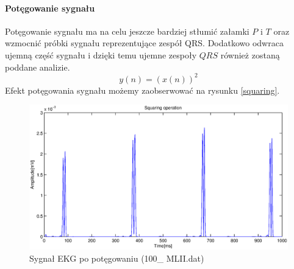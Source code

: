 \documentclass[a4paper, 11pt]{article}
\begin{document}
\paragraph{Potęgowanie sygnału}
Potęgowanie sygnału ma na celu jeszcze bardziej stłumić załamki $P$ i $T$ oraz wzmocnić próbki
sygnału reprezentujące zespół QRS. Dodatkowo odwraca ujemną część sygnału i dzięki temu ujemne zespoły $QRS$ również zostaną poddane analizie.
\begin{equation}
y(n) = (x(n))^2\label{eq:f}
\end{equation}
\indent Efekt potęgowania sygnału możemy zaobserwować na rysunku \eqref{squaring}.
\begin{figure}[h]
\centering
\includegraphics[scale=0.5]{include/squaring.eps}
\caption{Sygnał EKG po potęgowaniu (100\_ MLII.dat)}
\label{squaring}
\end{figure}\\
\newpage
\end{document}
